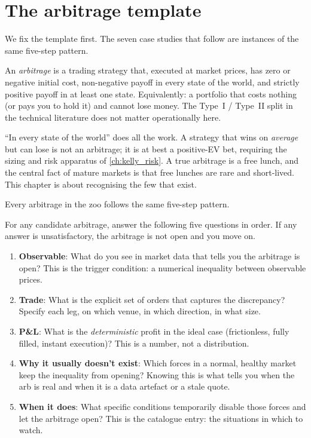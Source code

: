 \section{The arbitrage template}
\label{sec:ch13_template}

We fix the template first. The seven case studies that follow
are instances of the same five-step pattern.

\begin{definition}[Arbitrage]
\label{def:arbitrage}
An \emph{arbitrage} is a trading strategy that, executed at
market prices, has zero or negative initial cost, non-negative
payoff in every state of the world, and strictly positive payoff
in at least one state. Equivalently: a portfolio that costs
nothing (or pays you to hold it) and cannot lose money. The
Type~I / Type~II split in the technical literature does not
matter operationally here.
\end{definition}

``In every state of the world'' does all the work. A strategy
that wins on \emph{average} but can lose is not an arbitrage; it
is at best a positive-EV bet, requiring the sizing and risk
apparatus of \cref{ch:kelly_risk}. A true arbitrage is a free
lunch, and the central fact of mature markets is that free
lunches are rare and short-lived. This chapter is about
recognising the few that exist.

Every arbitrage in the zoo follows the same five-step pattern.

\begin{keyfactbox}
\label{kf:arb_template}
For any candidate arbitrage, answer the following five questions
in order. If any answer is unsatisfactory, the arbitrage is not
open and you move on.
\begin{enumerate}
  \item \textbf{Observable}: What do you see in market data that
  tells you the arbitrage is open? This is the trigger
  condition: a numerical inequality between observable prices.
  \item \textbf{Trade}: What is the explicit set of orders that
  captures the discrepancy? Specify each leg, on which venue,
  in which direction, in what size.
  \item \textbf{P\&L}: What is the \emph{deterministic} profit
  in the ideal case (frictionless, fully filled, instant
  execution)? This is a number, not a distribution.
  \item \textbf{Why it usually doesn't exist}: Which forces in a
  normal, healthy market keep the inequality from opening?
  Knowing this is what tells you when the arb is real and when
  it is a data artefact or a stale quote.
  \item \textbf{When it does}: What specific conditions
  temporarily disable those forces and let the arbitrage open?
  This is the catalogue entry: the situations in which to
  watch.
\end{enumerate}
\end{keyfactbox}

